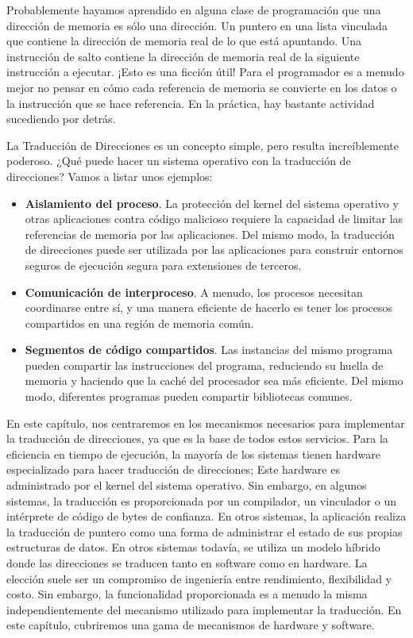 \documentclass[10pt]{book}
\begin{document}
Probablemente hayamos aprendido en alguna clase de programación que una dirección de memoria es sólo una dirección. Un puntero en una lista vinculada que contiene la dirección de memoria real de lo que está apuntando. Una instrucción de salto contiene la dirección de memoria real de la siguiente instrucción a ejecutar. ¡Esto es una ficción útil! Para el programador es a menudo mejor no pensar en cómo cada referencia de memoria se convierte en los datos o la instrucción que se hace referencia. En la práctica, hay bastante actividad sucediendo por detrás.

La Traducción de Direcciones es un concepto simple, pero resulta increíblemente poderoso. ¿Qué puede hacer un sistema operativo con la traducción de direcciones? Vamos a listar unos ejemplos:
\begin{itemize}
\item \textbf{Aislamiento del proceso}. La protección del kernel del sistema operativo y otras aplicaciones contra código malicioso requiere la capacidad de limitar las referencias de memoria por las aplicaciones. Del mismo modo, la traducción de direcciones puede ser utilizada por las aplicaciones para construir entornos seguros de ejecución segura para extensiones de terceros.

\item \textbf{Comunicación de interproceso}. A menudo, los procesos necesitan coordinarse entre sí, y una manera eficiente de hacerlo es tener los procesos compartidos en una región de memoria común.

\item \textbf{Segmentos de código compartidos}. Las instancias del mismo programa pueden compartir las instrucciones del programa, reduciendo su huella de memoria y haciendo que la caché del procesador sea más eficiente. Del mismo modo, diferentes programas pueden compartir bibliotecas comunes.
\end{itemize}

En este capítulo, nos centraremos en los mecanismos necesarios para implementar la traducción de direcciones, ya que es la base de todos estos servicios. Para la eficiencia en tiempo de ejecución, la mayoría de los sistemas tienen hardware especializado para hacer traducción de direcciones; Este hardware es administrado por el kernel del sistema operativo. Sin embargo, en algunos sistemas, la traducción es proporcionada por un compilador, un vinculador o un intérprete de código de bytes de confianza. En otros sistemas, la aplicación realiza la traducción de puntero como una forma de administrar el estado de sus propias estructuras de datos. En otros sistemas todavía, se utiliza un modelo híbrido donde las direcciones se traducen tanto en software como en hardware. La elección suele ser un compromiso de ingeniería entre rendimiento, flexibilidad y costo. Sin embargo, la funcionalidad proporcionada es a menudo la misma independientemente del mecanismo utilizado para implementar la traducción. En este capítulo, cubriremos una gama de mecanismos de hardware y software.
\end{document}
